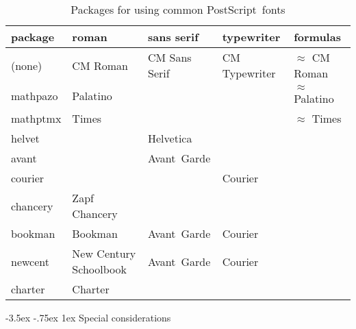 \documentclass[11pt]{ltxguide}[1995/11/28]
\makeatletter
\renewcommand\section{\@startsection{section}{1}{\z@}%
{-3.5ex \@plus -.75ex}%
{1ex}%
{\normalfont\Large\bfseries}}
\newcommand{\ps}{PostScript}
\newcommand{\Lpack}[1]{\textsf{#1}}
\makeatother
\begin{document}
\begin{table}[h!]
\caption{Packages for using common \ps\ fonts}
\label{tab:packages}
\medskip
{\footnotesize
\begin{center}
\renewcommand{\arraystretch}{1.2}
\begin{tabular}{|l|p{1.8cm}p{2.2cm}p{2.4cm}p{2.2cm}|}
\hline
\textbf{package} & \textbf{roman}  & \textbf{sans serif} & \textbf{typewriter} & \textbf{formulas} \\\hline\hline
(none)           & CM Roman        & CM Sans Serif       & CM Typewriter       & $\approx$ CM Roman\\\hline
\Lpack{mathpazo} & Palatino
                 &
                 &
                 & $\approx$ Palatino\\\hline
\Lpack{mathptmx} & Times
                 &
                 &
                 & $\approx$ Times\\\hline
\Lpack{helvet}   &
                 & Helvetica
                 &
                 & \\\hline
\Lpack{avant}    &
                 & Avant~Garde
                 &
                 & \\\hline
\Lpack{courier}  &
                 &
                 & Courier
                 & \\\hline
\Lpack{chancery} & Zapf Chancery
                 &
                 &
                 & \\\hline
\Lpack{bookman}  & Bookman
                 & Avant~Garde
                 & Courier
                 & \\\hline
\Lpack{newcent}  & New Century Schoolbook
                 & Avant~Garde
                 & Courier
                 & \\\hline
\Lpack{charter}  & Charter
                 &
                 &
                 & \\\hline
\end{tabular}
\end{center}
}
\end{table}



\section{Special considerations}
\end{document}
